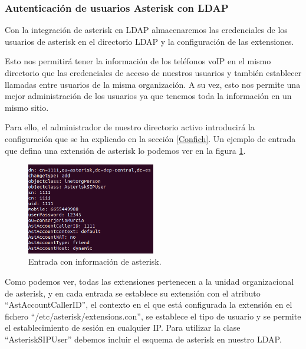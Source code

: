 \documentclass[a4paper]{article}
\begin{document}
\subsubsection{Autenticación de usuarios Asterisk con LDAP}
Con la integración de asterisk en LDAP almacenaremos las credenciales de los usuarios de asterisk en el directorio LDAP y la configuración de las extensiones. 

Esto nos permitirá tener la información de los teléfonos voIP en el mismo directorio que las credenciales de acceso de nuestros usuarios y también establecer llamadas entre usuarios de la misma organización. A su vez, esto nos permite una mejor administración de los usuarios ya que tenemos toda la información en un mismo sitio. 

Para ello, el administrador de nuestro directorio activo introducirá la configuración que se ha explicado en la sección \ref{Confich}. Un ejemplo de entrada que defina una extensión de asterisk lo podemos ver en la figura \ref{fig:users-aster}.

\begin{figure}[htb]
    \begin{center}
        \includegraphics[width=0.5\textwidth]{ldap/asterisk-user.png}
        \caption{Entrada con información de asterisk.}
         \label{fig:users-aster}
    \end{center}
\end{figure}
\newpage
Como podemos ver, todas las extensiones pertenecen a la unidad organizacional de asterisk, y en cada entrada se establece su extensión con el atributo ``AstAccountCallerID'', el contexto en el que está configurada la extensión en el fichero ``/etc/asterisk/extensions.con'', se establece el tipo de usuario y se permite el establecimiento de sesión en cualquier IP. Para utilizar la clase ``AsteriskSIPUser'' debemos incluir el esquema de asterisk en nuestro LDAP.
\end{document}
